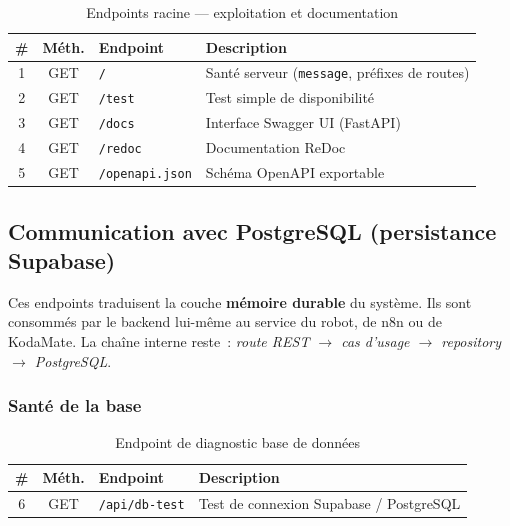 \documentclass[a4paper,12pt]{report}
\begin{document}
	\begin{table}[htbp]
		\centering
		\caption{Endpoints racine --- exploitation et documentation}
		\label{tab:ch4-endpoints-infra}
		\small
		\renewcommand{\arraystretch}{1.2}
		\begin{tabularx}{\textwidth}{|c|c|>{\raggedright\arraybackslash}p{4.2cm}|>{\raggedright\arraybackslash}X|}
			\hline
			\textbf{\#} & \textbf{Méth.} & \textbf{Endpoint} & \textbf{Description} \\
			\hline
			1 & GET & \texttt{/} & Santé serveur (\texttt{message}, préfixes de routes) \\
			2 & GET & \texttt{/test} & Test simple de disponibilité \\
			3 & GET & \texttt{/docs} & Interface Swagger UI (FastAPI) \\
			4 & GET & \texttt{/redoc} & Documentation ReDoc \\
			5 & GET & \texttt{/openapi.json} & Schéma OpenAPI exportable \\
			\hline
		\end{tabularx}
	\end{table}
	
	\subsection{Communication avec PostgreSQL (persistance Supabase)}
	
	Ces endpoints traduisent la couche \textbf{mémoire durable} du système. Ils sont
	consommés par le backend lui-même au service du robot, de n8n ou de KodaMate. La
	chaîne interne reste~:
	\textit{route REST $\rightarrow$ cas d'usage $\rightarrow$ repository $\rightarrow$ PostgreSQL}.
	
	\subsubsection{Santé de la base}
	
	\begin{table}[htbp]
		\centering
		\small
		\renewcommand{\arraystretch}{1.2}
		\begin{tabularx}{\textwidth}{|c|c|>{\raggedright\arraybackslash}p{5.5cm}|>{\raggedright\arraybackslash}X|}
			\hline
			\textbf{\#} & \textbf{Méth.} & \textbf{Endpoint} & \textbf{Description} \\
			\hline
			6 & GET & \texttt{/api/db-test} & Test de connexion Supabase / PostgreSQL \\
			\hline
		\end{tabularx}
		\caption{Endpoint de diagnostic base de données}
		\label{tab:ch4-endpoints-dbtest}
	\end{table}
	
\end{document}

